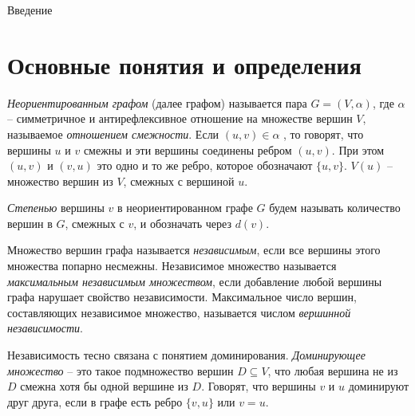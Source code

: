 \documentclass[bachelor, och, nir]{SCWorks}
\begin{document}




\tableofcontents

\intro
Введение

\section{Основные понятия и определения}
\textit{Неориентированным графом} (далее графом) называется пара $G = (V, \alpha)$, где $\alpha$ -- симметричное и антирефлексивное отношение на множестве вершин $V$, называемое \textit{отношением смежности}. Если $(u,v) \in \alpha$ , то говорят, что вершины $u$ и $v$ смежны и эти вершины соединены ребром $(u, v)$. При
этом $(u, v)$ и $(v, u)$ это одно и то же ребро, которое обозначают $\{u, v\}$. $V(u)$ -- множество вершин из $V$,
смежных с вершиной $u$.

\textit{Степенью} вершины $v$ в неориентированном графе $G$ будем называть количество вершин в $G$, смежных с $v$, и обозначать через $d(v)$.

Множество вершин графа называется \textit{независимым}, если все вершины
этого множества попарно несмежны. Независимое множество называется \textit{максимальным независимым множеством}, если добавление любой вершины графа нарушает свойство независимости. Максимальное число вершин, составляющих независимое множество, называется числом \textit{вершинной независимости}. 

Независимость тесно связана с понятием доминирования. 
\textit{Доминирующее множество} -- это такое подмножество вершин $D \subseteq V$, 
что любая вершина не из $D$ смежна хотя бы одной вершине из $D$. Говорят, 
что вершины $v$ и $u$ доминируют друг друга, если в графе есть ребро $\{v, u\}$ или
$v = u$. 
\end{document}
